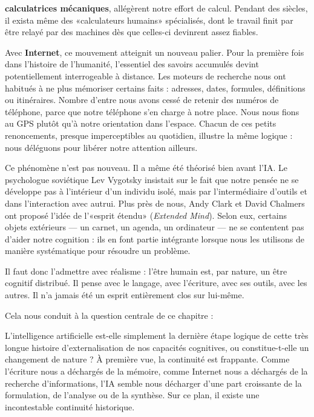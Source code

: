 \textbf{calculatrices mécaniques}, allégèrent notre effort de calcul. Pendant des siècles, il exista même des «calculateurs humains» spécialisés, dont le travail finit par être relayé par des machines dès que celles-ci devinrent assez fiables.

Avec \textbf{Internet}, ce mouvement atteignit un nouveau palier. Pour la première fois dans l'histoire de l'humanité, l'essentiel des savoirs accumulés devint potentiellement interrogeable à distance. Les moteurs de recherche nous ont habitués à ne plus mémoriser certains faits : adresses, dates, formules, définitions ou itinéraires. Nombre d'entre nous avons cessé de retenir des numéros de téléphone, parce que notre téléphone s'en charge à notre place. Nous nous fions au GPS plutôt qu'à notre orientation dans l'espace. Chacun de ces petits renoncements, presque imperceptibles au quotidien, illustre la même logique : nous déléguons pour libérer notre attention ailleurs.

Ce phénomène n'est pas nouveau. Il a même été théorisé bien avant l'IA. Le psychologue soviétique Lev Vygotsky insistait sur le fait que notre pensée ne se développe pas à l'intérieur d'un individu isolé, mais par l'intermédiaire d'outils et dans l'interaction avec autrui. Plus près de nous, Andy Clark et David Chalmers ont proposé l'idée de l'«esprit étendu» (\emph{Extended Mind}). Selon eux, certains objets extérieurs — un carnet, un agenda, un ordinateur — ne se contentent pas d'aider notre cognition : ils en font partie intégrante lorsque nous les utilisons de manière systématique pour résoudre un problème.

Il faut donc l'admettre avec réalisme : l'être humain est, par nature, un être cognitif distribué. Il pense avec le langage, avec l'écriture, avec ses outils, avec les autres. Il n'a jamais été un esprit entièrement clos sur lui-même.

Cela nous conduit à la question centrale de ce chapitre :

\begin{aiquote}
L'intelligence artificielle est-elle simplement la dernière étape logique de cette très longue histoire d'externalisation de nos capacités cognitives, ou constitue-t-elle un changement de nature ? À première vue, la continuité est frappante. Comme l'écriture nous a déchargés de la mémoire, comme Internet nous a déchargés de la recherche d'informations, l'IA semble nous décharger d'une part croissante de la formulation, de l'analyse ou de la synthèse. Sur ce plan, il existe une incontestable continuité historique.
\end{aiquote}

